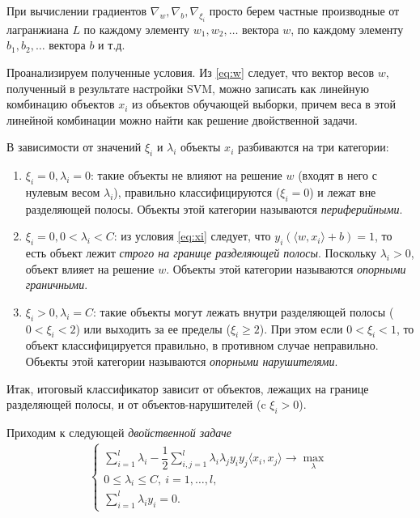 \documentclass[%
	11pt,
	a4paper,
	utf8,
		]{article}
\begin{document}
При вычислении градиентов $ \nabla_w, \nabla_b, \nabla_{\xi_i} $ просто берем частные производные от лагранжиана $ L $ по каждому элементу $ w_1, w_2, \ldots $ вектора $ w $, по каждому элементу $ b_1, b_2, \ldots $ вектора $ b $ и т.д.

Проанализируем полученные условия. Из \eqref{eq:w} следует, что вектор весов $ w $, полученный в результате настройки SVM, можно записать как линейную комбинацию объектов $ x_i $ из объектов обучающей выборки, причем веса в этой линейной комбинации можно найти как решение двойственной задачи.

В зависимости от значений $ \xi_i $ и $ \lambda_i $ объекты $ x_i $ разбиваются на три категории:
\begin{enumerate}
	\item $ \xi_i = 0, \lambda_i = 0 $: такие объекты не влияют на решение $ w $ (входят в него с нулевым весом $ \lambda_i $), правильно классифицируются ($ \xi_i = 0 $) и лежат вне разделяющей полосы. Объекты этой категории называются \emph{периферийными}.
	
	\item $ \xi_i = 0, 0 < \lambda_i < C $: из условия \eqref{eq:xi} следует, что $ y_i ( \langle w, x_i \rangle + b ) = 1 $, то есть объект лежит \emph{строго на границе разделяющей полосы}. Поскольку $ \lambda_i > 0 $, объект влияет на решение $ w $. Объекты этой категории называются \emph{опорными граничными}.
	
	\item $ \xi_i > 0, \lambda_i = C $: такие объекты могут лежать внутри разделяющей полосы ($ 0 < \xi_i < 2 $) или выходить за ее пределы ($ \xi_i \geqslant 2 $). При этом если $ 0 < \xi_i < 1 $, то объект классифицируется правильно, в противном случае неправильно. Объекты этой категории называются \emph{опорными нарушителями}.
\end{enumerate}

Итак, итоговый классификатор зависит от объектов, лежащих на границе разделяющей полосы, и от объектов-нарушителей (c $ \xi_i > 0 $).

Приходим к следующей \emph{двойственной задаче}
\begin{align*}
	\begin{cases}
	    \sum\limits_{i=1}^{l} \lambda_i - \dfrac{1}{2} \sum\limits_{i,j=1}^{l} \lambda_i \lambda_j y_i y_j \langle x_i, x_j \rangle \to \max\limits_\lambda \\
	    0 \leqslant \lambda_i \leqslant C, \ i = 1, \ldots, l, \\
	    \sum\limits_{i=1}^{l} \lambda_i y_i = 0.
	\end{cases}
\end{align*}
\end{document}
